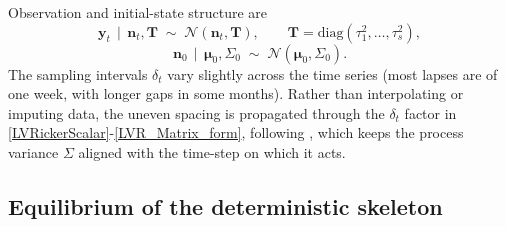 \documentclass[12pt]{article}
\begin{document}
Observation and initial-state structure are
\begin{equation}\label{LVR_Obs_model_supp}
	\mathbf{y}_{t}\,\mid\,\mathbf{n}_{t},\mathbf{T} \;\sim\; \mathcal{N}(\mathbf{n}_{t},\mathbf{T}),\qquad \mathbf{T}=\mathrm{diag}(\tau_{1}^{2},\ldots,\tau_{s}^{2}),
\end{equation}
\begin{equation}\label{LVR_Init}
	\mathbf{n}_{0}\,\mid\,\boldsymbol{\mu}_{0},\Sigma_{0} \;\sim\; \mathcal{N}(\boldsymbol{\mu}_{0},\Sigma_{0}).
\end{equation}
The sampling intervals $\delta_{t}$ vary slightly across the time series (most lapses are of one week, with longer gaps in some months). Rather than interpolating or imputing data, the uneven spacing is propagated through the $\delta_{t}$ factor in \eqref{LVRickerScalar}-\eqref{LVR_Matrix_form}, following \citealp{Clark2004,Clark2007,Mutshinda2011,Almaraz2024}, which keeps the process variance $\Sigma$ aligned with the time-step on which it acts.

\subsection{Equilibrium of the deterministic skeleton}
\end{document}
